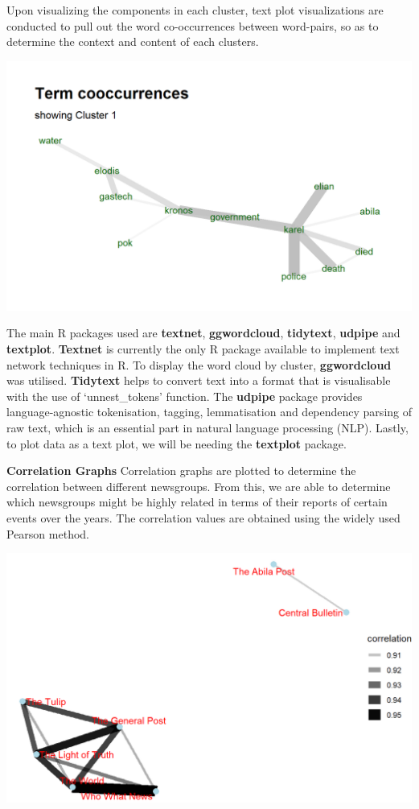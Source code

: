\documentclass{acm_proc_article-sp}
\begin{document}
Upon visualizing the components in each cluster, text plot
visualizations are conducted to pull out the word co-occurrences between
word-pairs, so as to determine the context and content of each clusters.

\includegraphics{img/image05.png}

The main R packages used are \textbf{textnet}, \textbf{ggwordcloud},
\textbf{tidytext}, \textbf{udpipe} and \textbf{textplot}.
\textbf{Textnet} is currently the only R package available to implement
text network techniques in R. To display the word cloud by cluster,
\textbf{ggwordcloud} was utilised. \textbf{Tidytext} helps to convert
text into a format that is visualisable with the use of `unnest\_tokens'
function. The \textbf{udpipe} package provides language-agnostic
tokenisation, tagging, lemmatisation and dependency parsing of raw text,
which is an essential part in natural language processing (NLP). Lastly,
to plot data as a text plot, we will be needing the \textbf{textplot}
package.

\textbf{Correlation Graphs} Correlation graphs are plotted to determine
the correlation between different newsgroups. From this, we are able to
determine which newsgroups might be highly related in terms of their
reports of certain events over the years. The correlation values are
obtained using the widely used Pearson method.

\includegraphics{img/image06.png}
\end{document}

